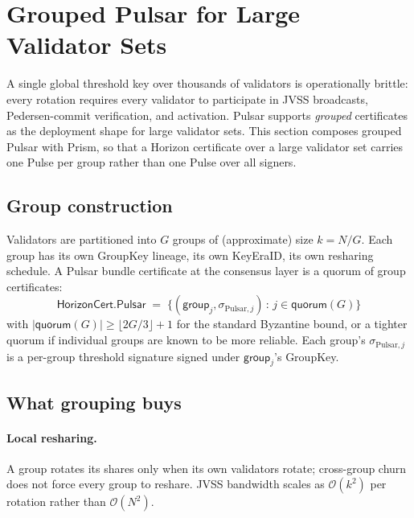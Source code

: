 \section{Grouped Pulsar for Large Validator Sets}
\label{sec:grouped-pulsar}

A single global threshold key over thousands of validators is operationally brittle: every rotation requires every validator to participate in JVSS broadcasts, Pedersen-commit verification, and activation. Pulsar supports \emph{grouped} certificates as the deployment shape for large validator sets. This section composes grouped Pulsar with Prism, so that a Horizon certificate over a large validator set carries one Pulse per group rather than one Pulse over all signers.

\subsection{Group construction}

Validators are partitioned into $G$ groups of (approximate) size $k = N / G$. Each group has its own GroupKey lineage, its own KeyEraID, its own resharing schedule. A Pulsar bundle certificate at the consensus layer is a quorum of group certificates:
\begin{equation}
  \mathsf{HorizonCert}.\mathsf{Pulsar} \;=\; \bigl\{ (\mathsf{group}_j, \sigma_{\mathrm{Pulsar},j}) \,:\, j \in \mathsf{quorum}(G) \bigr\}
\end{equation}
with $|\mathsf{quorum}(G)| \geq \lfloor 2G/3 \rfloor + 1$ for the standard Byzantine bound, or a tighter quorum if individual groups are known to be more reliable. Each group's $\sigma_{\mathrm{Pulsar},j}$ is a per-group threshold signature signed under $\mathsf{group}_j$'s GroupKey.

\subsection{What grouping buys}

\paragraph{Local resharing.} A group rotates its shares only when its own validators rotate; cross-group churn does not force every group to reshare. JVSS bandwidth scales as $\mathcal{O}(k^2)$ per rotation rather than $\mathcal{O}(N^2)$.

